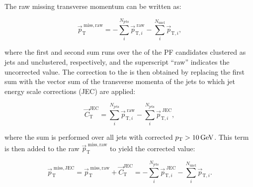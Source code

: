 The raw missing transverse momentum can be written as:

\begin{equation}
{\vec p}_\mathrm{T}^\mathrm{\; miss,raw} = - \sum_{i}^{N_\mathrm{jets}} {\vec p}_{\mathrm{T},i}^{\;\mathrm{raw}} - \sum_{i}^{N_\mathrm{uncl}} {\vec p}_{\mathrm{T},i},
\end{equation}

\noindent where the first and second sum runs over the \pt of the PF candidates clustered as jets and unclustered, respectively, and the superscript ``raw'' indicates the uncorrected value.
The correction to the \ptvecmiss is then obtained by replacing the first sum with the vector sum of the transverse momenta of the jets to which jet energy scale corrections (JEC) are applied:

\begin{equation}
{\vec C}_\mathrm{T}^\mathrm{JEC} = \sum_{i}^{N_\mathrm{jets}} {\vec p}_{\mathrm{T},i}^{\;\mathrm{raw}} - \sum_{i}^{N_\mathrm{jets}} {\vec p}_{\mathrm{T},i}^{\;\mathrm{JEC}},
\end{equation}

where the sum is performed over all jets with corrected $p_{\mathrm{T}} > 10\,\text{Ge\hspace{-.08em}V}$.
This term is then added to the raw ${\vec p}_\mathrm{T}^\mathrm{\; miss,raw}$ to yield the corrected value:

\begin{equation}
{\vec p}_\mathrm{T}^\mathrm{\; miss,JEC} = {\vec p}_\mathrm{T}^\mathrm{\; miss,raw} + {\vec C}_\mathrm{T}^\mathrm{JEC} = - \sum_{i}^{N_\mathrm{jets}} {\vec p}_{\mathrm{T},i}^{\;\mathrm{JEC}} - \sum_{i}^{N_\mathrm{uncl}} {\vec p}_{\mathrm{T},i}.
\end{equation}

